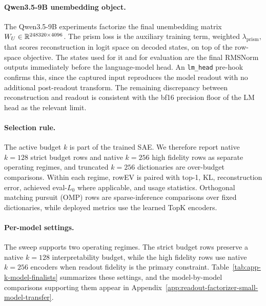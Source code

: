\paragraph{Qwen3.5-9B unembedding object.}
The Qwen3.5-9B experiments factorize the final unembedding matrix
$W_U\in\mathbb{R}^{248320\times4096}$. The prism loss is the auxiliary training
term, weighted $\lambda_{\mathrm{prism}}$, that scores reconstruction in
logit space on decoded states, on top of the row-space objective. The states used
for it and for evaluation are the final RMSNorm outputs immediately before
the language-model head. An \texttt{lm\_head} pre-hook confirms this, since the captured input
reproduces the model readout with no additional post-readout transform. The
remaining discrepancy between reconstruction and readout is consistent with the
bf16 precision floor of the LM head as the relevant limit.

\paragraph{Selection rule.}
The active budget $k$ is part of the trained SAE. We therefore report
native $k=128$ strict budget rows and native $k=256$ high fidelity rows as
separate operating regimes, and truncated $k=256$ dictionaries are over-budget
comparisons.
Within each regime, rowEV is paired with top-1, KL, reconstruction error, achieved eval-$L_0$
where applicable, and usage statistics. Orthogonal matching pursuit (OMP) rows
\citep{pati1993orthogonal} are sparse-inference comparisons over fixed
dictionaries, while deployed metrics use the learned TopK encoders.

\paragraph{Per-model settings.}
The sweep supports two operating regimes. The strict budget rows
preserve a native $k=128$ interpretability budget, while the
high fidelity rows use native $k=256$ encoders when readout fidelity is
the primary constraint. Table~\ref{tab:app-k-model-finalists} summarizes these
settings, and the model-by-model comparisons supporting them appear in
Appendix~\ref{app:readout-factorizer-small-model-transfer}.

